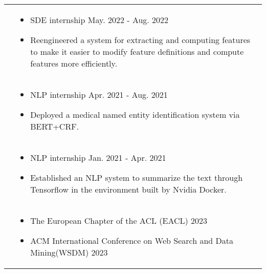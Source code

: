 \documentclass[letterpaper, 10pt]{article}
\begin{document}
\begin{longtable}{p{1.3in}p{4.8in}}

{\color{black}{Industry Experience}} 

&  \begin{itemize}[leftmargin=10pt, itemsep=-5pt, topsep=0pt,before=\textbf{Lime}]
    \item SDE internship \hfill May. 2022 - Aug. 2022 
    \item Reengineered a system for extracting and computing features to make it easier to modify feature definitions and compute features more efficiently.
  \end{itemize}\\ 

  

&  \begin{itemize}[leftmargin=10pt, itemsep=-5pt, topsep=0pt,before=\textbf{Umer Technology}]
    \item NLP internship \hfill Apr. 2021 - Aug. 2021 
    \item  Deployed a medical named entity identification system via BERT+CRF.
  \end{itemize}\\ 

&  \begin{itemize}[leftmargin=10pt, itemsep=-5pt, topsep=0pt,before=\textbf{Transwarp}]
    \item NLP internship \hfill Jan. 2021 - Apr. 2021 
    \item  Established an NLP system to summarize the text through Tensorflow in the environment built by Nvidia Docker.
  \end{itemize}\\ 


{\color{black}{Professional service}}
&  \begin{itemize}[leftmargin=10pt,topsep=0pt,before=\textbf{Program Committee}]
    \item The European Chapter of the ACL (EACL) \hfill 2023
    \item ACM International Conference on Web Search and Data Mining(WSDM) \hfill 2023
  \end{itemize}\\ 



\end{longtable}
\end{document}
